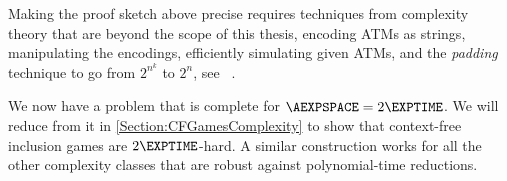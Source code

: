 \documentclass[../../diss.tex]{subfiles}
\begin{document}
\begin{remark*}
    Making the proof sketch above precise requires techniques from complexity theory that are beyond the scope of this thesis, \eg encoding ATMs as strings, manipulating the encodings, efficiently simulating given ATMs, and the \emph{padding} technique to go from $2^{n^k}$ to $2^n$, see \eg~\cite{Kozen06}.
\end{remark*}

We now have a problem that is complete for $\AEXPSPACE = 2\EXPTIME$.
We will reduce from it in \cref{Section:CFGamesComplexity} to show that context-free inclusion games are $2\EXPTIME$-hard.
A similar construction works for all the other complexity classes that are robust against polynomial-time reductions.
\end{document}
